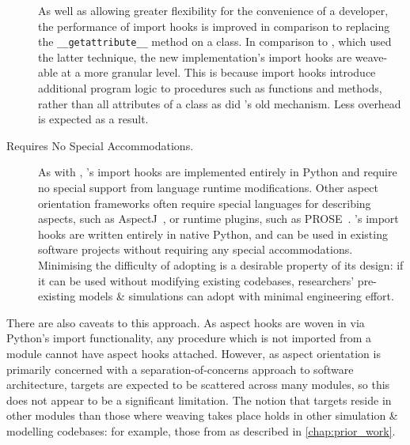 \begin{description}
        As well as allowing greater flexibility for the convenience of a
        developer, the performance of import hooks is improved in comparison to
        replacing the \lstinline{__getattribute__} method on a class. In
        comparison to \pydysofu{}, which used the
        latter technique, the new implementation's import hooks are weave-able
        at a more granular level. This is because import hooks introduce
        additional program logic to procedures such as functions and methods,
        rather than all attributes of a class as did
        \pydysofu{}'s old mechanism. Less overhead is expected as a result.

    \item[Requires No Special Accommodations.] As with \pydysofu{},
        \pdsfthree{}'s import hooks are implemented entirely in Python and
        require no special support from language runtime modifications. Other
        aspect orientation frameworks often require special languages for
        describing aspects, such as AspectJ~\cite{AspectJLanguageAndTools}, or
        runtime plugins, such as PROSE~\cite{popovici2002PROSE}. \pdsfthree{}'s
        import hooks are written entirely in native Python, and can be used in
        existing software projects without requiring any special accommodations.
        Minimising the difficulty of adopting \pdsfthree{} is a desirable property of
        its design: if it can be used without modifying existing codebases,
        researchers' pre-existing models \& simulations can adopt \pdsfthree{} with
        minimal engineering effort.
\end{description}

There are also caveats to this approach. As aspect hooks are woven in
\pdsfthree{} via Python's import functionality, any procedure which is not
imported from a module cannot have aspect hooks attached.  However, as aspect orientation is primarily
concerned with a separation-of-concerns approach to software architecture,
targets are expected to be scattered across many modules, so this does not
appear to be a significant limitation. The notion that targets reside in other
modules than those where weaving takes place holds in other \aspectoriented{}
simulation \& modelling codebases: for example, those from
\citet{wallis2018caise} as described in \cref{chap:prior_work}.



